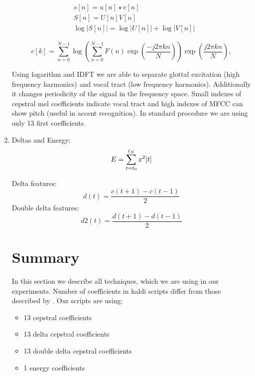 \begin{enumerate}
		\begin{align}
		& s[n]=u[n] \star v[n] \\
		& S[n]=U[n]V[n] \\
		& \log |S[n]|= \log |U[n]| + \log |V[n]| 
		\end{align}

		\begin{equation}
			c[k]= \sum\limits^{N-1}_{n=0} \log \left( \sum\limits^{N-1}_{n=0} F(n)\exp\left(\frac{-j2\pi kn}{N} \right) \right) \exp\left(\frac{j2\pi kn}{N} \right), 
		\end{equation}

		Using logarithm and IDFT we are able to separate glottal excitation (high frequency harmonics) and vocal tract (low frequency harmonics). Additionally it changes periodicity of the signal in the frequency space. Small indexes of cepstral mel coefficients indicate vocal tract and high indexes of MFCC can show pitch (useful in accent recognition). In standard procedure we are using only 13 first coefficients.

	\item Deltas and Energy:
	\begin{equation}
		E = \operatorname*{\sum}_{t=t_0}^{t_N} x^2[t]
	\end{equation}

	Delta features:
	\begin{equation}
		d(t)=\frac{c(t+1)-c(t-1)}{2}	
	\end{equation}
	Double delta features:
	\begin{equation}
		d2(t)=\frac{d(t+1)-d(t-1)}{2}	
	\end{equation}

\section{Summary}

In this section we describe all techniques, which we are using in our experiments. Number of coefficients in kaldi scripts differ from those described by \textcite{jurafsky}. Our scripts are using:

\begin{itemize}
	\item 13 cepstral coefficients
	\item 13 delta cepstral coefficients 
	\item 13 double delta cepstral coefficients
	\item 1 energy coefficients
\end{itemize}






\end{enumerate}


